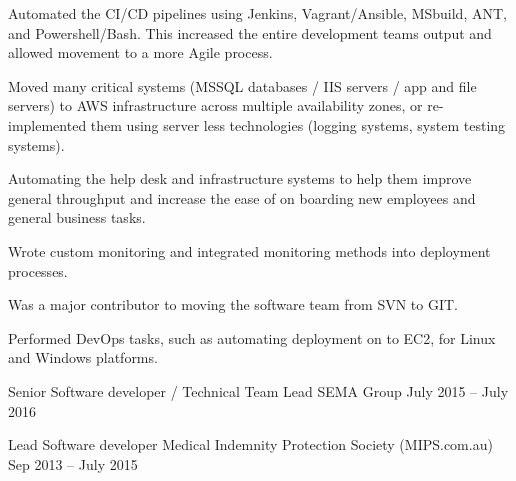 \begin{cventries}
{\begin{cvitems}
{                  \begin{cvitems}
                    \item {Automated the CI/CD pipelines using Jenkins,
                                Vagrant/Ansible, MSbuild, ANT, and
                                Powershell/Bash.
                                This increased the entire development teams
                                output and allowed movement to a more Agile
                                process.}
                    \item {Moved many critical systems (MSSQL databases / IIS
                                servers / app and file servers)  to AWS
                                infrastructure across multiple availability
                                zones, or re-implemented them using server less
                                technologies (logging
                                systems, system testing systems).}
                    \item {Automating the help desk and infrastructure systems
                                to help them improve general throughput and
                                increase the ease of on boarding new employees
                                and general business tasks.}
                    \item {Wrote custom monitoring and integrated monitoring
                                methods into deployment processes.}
                    \item {Was a major contributor to moving the software team
                                from SVN to GIT.}
                    \item {Performed DevOps tasks, such as automating
                                deployment on to EC2, for Linux and Windows
                                platforms.\\
                          }
                  \end{cvitems}
            }
    \end{cvitems}
  }

  \cventry
  {Senior Software developer / Technical Team Lead }
  {SEMA Group} %
  {} %
  {July 2015 – July 2016} %
  {}  %

  \cventry
  {Lead Software developer} %
  {Medical Indemnity Protection Society (MIPS.com.au)}
  {} %
  {Sep 2013 – July 2015} %
  {}  %


\end{cventries}
